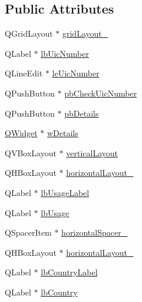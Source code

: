 \subsection*{Public Attributes}
\begin{DoxyCompactItemize}
\item 
Q\-Grid\-Layout $\ast$ \hyperlink{class_ui__mdt_uic_number_widget_aad4df9b6eed5d06b68fe8f12174d4279}{grid\-Layout\-\_}
\item 
Q\-Label $\ast$ \hyperlink{class_ui__mdt_uic_number_widget_af8aa1ff9918eab793c1d55cddc0bc475}{lb\-Uic\-Number}
\item 
Q\-Line\-Edit $\ast$ \hyperlink{class_ui__mdt_uic_number_widget_a54f725b165fa3dd408f7d808b07ae939}{le\-Uic\-Number}
\item 
Q\-Push\-Button $\ast$ \hyperlink{class_ui__mdt_uic_number_widget_a8c26e34387eef6c24ab5193b020816b7}{pb\-Check\-Uic\-Number}
\item 
Q\-Push\-Button $\ast$ \hyperlink{class_ui__mdt_uic_number_widget_ae6bdc7333828a55a945984bc456768fc}{pb\-Details}
\item 
\hyperlink{class_q_widget}{Q\-Widget} $\ast$ \hyperlink{class_ui__mdt_uic_number_widget_a30c1416cee780b360ebf6b1e48e4246c}{w\-Details}
\item 
Q\-V\-Box\-Layout $\ast$ \hyperlink{class_ui__mdt_uic_number_widget_ae4f4014f77661ccd79e805d2e17b4276}{vertical\-Layout}
\item 
Q\-H\-Box\-Layout $\ast$ \hyperlink{class_ui__mdt_uic_number_widget_a05657f94a0b4ba393f651c86c0307648}{horizontal\-Layout\-\_}
\item 
Q\-Label $\ast$ \hyperlink{class_ui__mdt_uic_number_widget_a21f0b2fe73e990a45d2bacf5465b568f}{lb\-Usage\-Label}
\item 
Q\-Label $\ast$ \hyperlink{class_ui__mdt_uic_number_widget_a4f67e2ccc534e79e356adff60982c34a}{lb\-Usage}
\item 
Q\-Spacer\-Item $\ast$ \hyperlink{class_ui__mdt_uic_number_widget_a8d6250a639700b3da08b83133b06b562}{horizontal\-Spacer\-\_}
\item 
Q\-H\-Box\-Layout $\ast$ \hyperlink{class_ui__mdt_uic_number_widget_a7cdf97b40ff73aad81bde1346d69f07d}{horizontal\-Layout\-\_}
\item 
Q\-Label $\ast$ \hyperlink{class_ui__mdt_uic_number_widget_afcc2536695dfb6853333913fcb3a0d78}{lb\-Country\-Label}
\item 
Q\-Label $\ast$ \hyperlink{class_ui__mdt_uic_number_widget_ac38fcaa4d27375706799fc1179d70317}{lb\-Country}
\item 

\end{DoxyCompactItemize}
